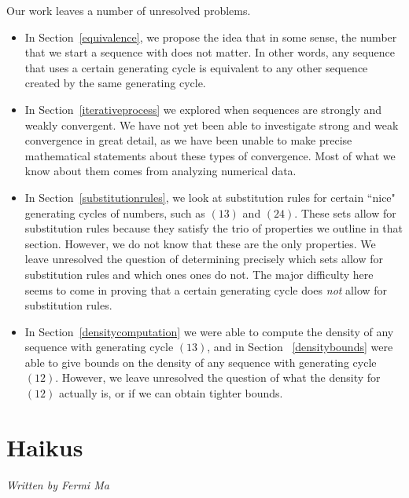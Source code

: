 \documentclass[runningheads,a4paper]{llncs}
\begin{document}
Our work leaves a number of unresolved problems. 

\begin{itemize}
\item In Section~\ref{equivalence}, we propose the idea that in some sense, the number that we start a sequence with does not matter. In other words, any sequence that uses a certain generating cycle is equivalent to any other sequence created by the same generating cycle.
\item In Section~\ref{iterativeprocess} we explored when sequences are strongly and weakly convergent. We have not yet been able to investigate strong and weak convergence in great detail, as we have been unable to make precise mathematical statements about these types of convergence. Most of what we know about them comes from analyzing numerical data.
\item In Section~\ref{substitutionrules}, we look at substitution rules for certain ``nice" generating cycles of numbers, such as $(13)$ and $(24)$. These sets allow for substitution rules because they satisfy the trio of properties we outline in that section. However, we do not know that these are the only properties. We leave unresolved the question of determining precisely which sets allow for substitution rules and which ones ones do not. The major difficulty here seems to come in proving that a certain generating cycle does \emph{not} allow for substitution rules.
\item In Section~\ref{densitycomputation} we were able to compute the density of any sequence with generating cycle $(13)$, and in Section ~\ref{densitybounds} were able to give bounds on the density of any sequence with generating cycle $(12)$. However, we leave unresolved the question of what the density for $(12)$ actually is, or if we can obtain tighter bounds.
\end{itemize}

\section{Haikus}
\emph{Written by Fermi Ma}\\
\end{document}
